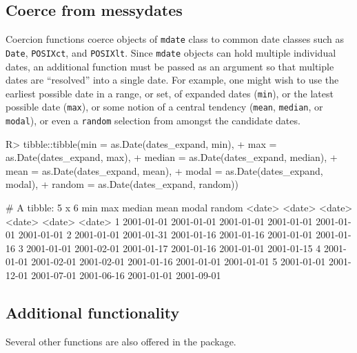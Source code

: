 \documentclass[
]{jss}
\begin{document}
\hypertarget{coerce-from-messydates}{%
\subsection{Coerce from messydates}\label{coerce-from-messydates}}

Coercion functions coerce objects of \texttt{mdate} class to common date
classes such as \texttt{Date}, \texttt{POSIXct}, and \texttt{POSIXlt}.
Since \texttt{mdate} objects can hold multiple individual dates, an
additional function must be passed as an argument so that multiple dates
are ``resolved'' into a single date. For example, one might wish to use
the earliest possible date in a range, or set, of expanded dates
(\texttt{min}), or the latest possible date (\texttt{max}), or some
notion of a central tendency (\texttt{mean}, \texttt{median}, or
\texttt{modal}), or even a \texttt{random} selection from amongst the
candidate dates.

\begin{CodeChunk}
\begin{CodeInput}
R> tibble::tibble(min = as.Date(dates_expand, min),
+                max = as.Date(dates_expand, max),
+                median = as.Date(dates_expand, median),
+                mean = as.Date(dates_expand, mean),
+                modal = as.Date(dates_expand, modal),
+                random = as.Date(dates_expand, random))
\end{CodeInput}
\begin{CodeOutput}
# A tibble: 5 x 6
  min        max        median     mean       modal      random    
  <date>     <date>     <date>     <date>     <date>     <date>    
1 2001-01-01 2001-01-01 2001-01-01 2001-01-01 2001-01-01 2001-01-01
2 2001-01-01 2001-01-31 2001-01-16 2001-01-16 2001-01-01 2001-01-16
3 2001-01-01 2001-02-01 2001-01-17 2001-01-16 2001-01-01 2001-01-15
4 2001-01-01 2001-02-01 2001-02-01 2001-01-16 2001-01-01 2001-01-01
5 2001-01-01 2001-12-01 2001-07-01 2001-06-16 2001-01-01 2001-09-01
\end{CodeOutput}
\end{CodeChunk}

\hypertarget{additional-functionality}{%
\subsection{Additional functionality}\label{additional-functionality}}

Several other functions are also offered in the 
package.
\end{document}

